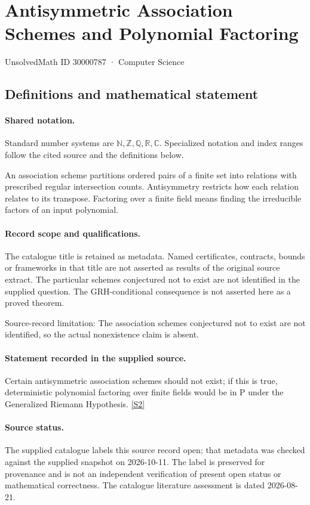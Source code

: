 \documentclass[11pt]{article}
\newcommand{\sref}[2]{\hyperlink{source:#1:#2}{[S#2]}}
\begin{document}
\setcounter{section}{30000786}
\section{Antisymmetric Association Schemes and Polynomial Factoring}\label{30000787}
{\small\sffamily UnsolvedMath ID 30000787 · Computer Science}
\subsection{Definitions and mathematical statement}

\paragraph{Shared notation.}Standard number systems are $\mathbb N,\mathbb Z,\mathbb Q,\mathbb R,\mathbb C$. Specialized notation and index ranges follow the cited source and the definitions below.


An association scheme partitions ordered pairs of a finite set into relations with prescribed regular intersection counts. Antisymmetry restricts how each relation relates to its transpose. Factoring over a finite field means finding the irreducible factors of an input polynomial.
\paragraph{Record scope and qualifications.}
The catalogue title is retained as metadata. Named certificates, contracts, bounds or frameworks in that title are not asserted as results of the original source extract.
The particular schemes conjectured not to exist are not identified in the supplied question. The GRH-conditional consequence is not asserted here as a proved theorem.

Source-record limitation: The association schemes conjectured not to exist are not identified, so the actual nonexistence claim is absent.
\paragraph{Statement recorded in the supplied source.}
Certain antisymmetric association schemes should not exist; if this is true, deterministic polynomial factoring over finite fields would be in $\mathrm{P}$ under the Generalized Riemann Hypothesis. \sref{30000787}{2}
\paragraph{Source status.}
The supplied catalogue labels this source record open; that metadata was checked against the supplied snapshot on 2026-10-11. The label is preserved for provenance and is not an independent verification of present open status or mathematical correctness. The catalogue literature assessment is dated 2026-08-21.
\end{document}
